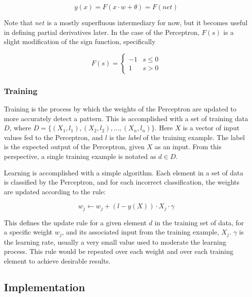 \documentclass[a4paper, 11pt]{article} %
\begin{document}
\begin{equation}
y(x) = F(x \cdot w + \theta ) = F(net)
\end{equation}

Note that $net$ is a mostly superfluous intermediary for now, but it becomes useful in defining partial derivatives later.  In the case of the Perceptron, $F(s)$ is a slight modification of the sign function, specifically

\begin{equation}
F(s) = 
\begin{cases}
	-1 & s\leq 0 \\
	1        & s>0
\end{cases}
\end{equation}

\subsubsection*{Training}

Training is the process by which the weights of the Perceptron are updated to more accurately detect a pattern.  This is accomplished with a set of training data $D$, where $D = \{ (X_1,l_1),(X_2,l_2),...,(X_n,l_n) \}$.  Here $X$ is a vector of input values fed to the Perceptron, and $l$ is the \textit{label} of the training example.  The label is the expected output of the Perceptron, given $X$ as an input.  From this perspective, a single training example is notated as $d \in D$.

Learning is accomplished with a simple algorithm.  Each element in a set of data is classified by the Perceptron, and for each incorrect classification, the weights are updated according to the rule:

\begin{equation}
w_j \leftarrow w_j + (l - y(X)) \cdot X_j \cdot \gamma
\end{equation}

This defines the update rule for a given element $d$ in the training set of data, for a specific weight $w_j$, and its associated input from the training example, $X_j$.  $\gamma$ is the learning rate, usually a very small value used to moderate the learning process.  This rule would be repeated over each weight and over each training element to achieve desirable results.

\subsection*{Implementation}
\end{document}
